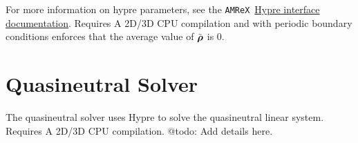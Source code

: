 \documentclass[11pt]{article}
\begin{document}
For more information on hypre parameters, see the \lstinline{AMReX}~\href{https://amrex-codes.github.io/amrex/docs_html/LinearSolvers.html#external-solvers}{Hypre interface documentation}.
Requires A 2D/3D CPU compilation and with periodic boundary conditions enforces that the average value of ${\tilde{\boldsymbol {\rm \mathsf{\rho}}}}$ is $0$. 

\section{Quasineutral Solver}
The quasineutral solver uses Hypre to solve the quasineutral linear system.
Requires A 2D/3D CPU compilation.
@todo: Add details here.
\end{document}
